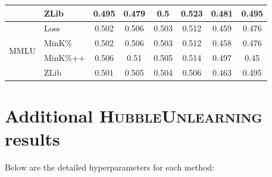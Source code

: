 \documentclass{article} %
\begin{document}
\begin{table}[h]
\begin{tabular}{clcccccc}
                                     & ZLib                                                        &   0.495       &   0.479      &  0.5       &   0.523       &   0.481       &  0.495           \\ \midrule
\multirow{4}{*}{MMLU}                & Loss                                                        &   0.502       &   0.506      &  0.503       &   0.512       &   0.459       &  0.476           \\  
                                     & MinK\%                                                      &   0.502       &   0.506      &  0.503       &   0.512       &   0.458       &  0.476           \\  
                                     & MinK\%++                                                    &   0.506       &   0.51      &  0.505       &   0.514       &   0.497       &  0.45           \\  
                                     & ZLib                                                        &   0.501       &   0.505      &  0.504       &   0.506       &   0.463       &  0.495           \\ \bottomrule
\end{tabular}
\end{table}

% 

\newpage
\section{Additional \textsc{HubbleUnlearning} results}
\label{sec:unlearn_grid_search} \label{sec:unlearn_full_results}

Below are the detailed hyperparameters for each method: 
\end{document}
